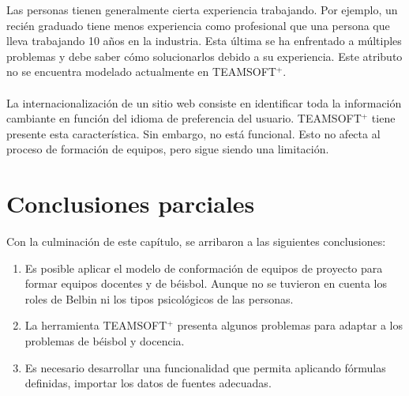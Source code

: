 Las personas tienen generalmente cierta experiencia trabajando. Por ejemplo, un recién graduado tiene menos experiencia como profesional que una persona que lleva trabajando 10 años en la industria. Esta última se ha enfrentado a múltiples problemas y debe saber cómo solucionarlos debido a su experiencia. Este atributo no se encuentra modelado actualmente en TEAMSOFT$^+$. \\\\

La internacionalización de un sitio web consiste en identificar toda la información cambiante en función del idioma de preferencia del usuario. TEAMSOFT$^+$ tiene presente esta característica. Sin embargo, no está funcional. Esto no afecta al proceso de formación de equipos, pero sigue siendo una limitación.

\section{Conclusiones parciales}

Con la culminación de este capítulo, se arribaron a las siguientes conclusiones:
\begin{enumerate}
	\item Es posible aplicar el modelo de conformación de equipos de proyecto para formar equipos docentes y de béisbol. Aunque no se tuvieron en cuenta los roles de Belbin ni los tipos psicológicos de las personas.
	\item La herramienta TEAMSOFT$^+$ presenta algunos problemas para adaptar a los problemas de béisbol y docencia.
	\item Es necesario desarrollar una funcionalidad que permita aplicando fórmulas definidas, importar los datos de fuentes adecuadas.
\end{enumerate}
